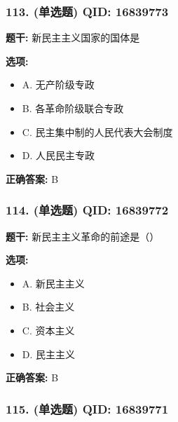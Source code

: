 \documentclass[12pt,UTF8]{ctexart}
\begin{document}
\subsubsection*{113. (单选题) \small QID: 16839773}

\textbf{题干:}
新民主主义国家的国体是

\textbf{选项:}
\begin{itemize}[leftmargin=*]

  \item A. 无产阶级专政

  \item B. 各革命阶级联合专政

  \item C. 民主集中制的人民代表大会制度

  \item D. 人民民主专政

\end{itemize}

\textbf{正确答案:}
B

\vspace{0.3em}\hrulefill\vspace{0.7em}

\subsubsection*{114. (单选题) \small QID: 16839772}

\textbf{题干:}
新民主主义革命的前途是（）

\textbf{选项:}
\begin{itemize}[leftmargin=*]

  \item A. 新民主主义

  \item B. 社会主义

  \item C. 资本主义

  \item D. 民主主义

\end{itemize}

\textbf{正确答案:}
B

\vspace{0.3em}\hrulefill\vspace{0.7em}

\subsubsection*{115. (单选题) \small QID: 16839771}
\end{document}
